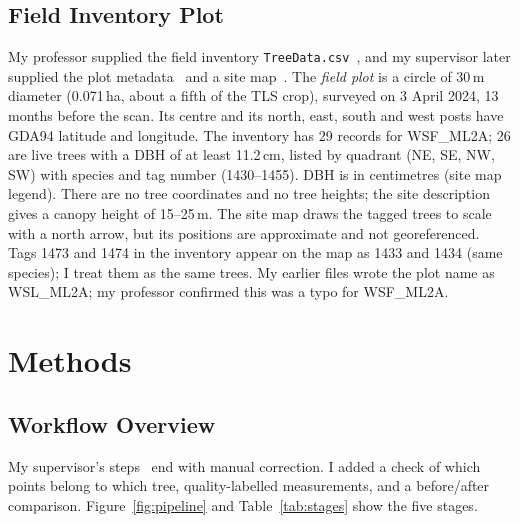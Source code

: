 \documentclass[runningheads]{llncs}
\begin{document}
\subsection{Field Inventory Plot}\label{sec:field}
My professor supplied the field inventory \texttt{TreeData.csv}~\cite{treedata}, and my supervisor later supplied the plot metadata~\cite{plotdata} and a site map~\cite{sitemap}. The \emph{field plot} is a circle of 30\,m diameter (0.071\,ha, about a fifth of the TLS crop), surveyed on 3 April 2024, 13 months before the scan. Its centre and its north, east, south and west posts have GDA94 latitude and longitude. The inventory has 29 records for WSF\_ML2A; 26 are live trees with a DBH of at least 11.2\,cm, listed by quadrant (NE, SE, NW, SW) with species and tag number (1430--1455). DBH is in centimetres (site map legend). There are no tree coordinates and no tree heights; the site description gives a canopy height of 15--25\,m. The site map draws the tagged trees to scale with a north arrow, but its positions are approximate and not georeferenced. Tags 1473 and 1474 in the inventory appear on the map as 1433 and 1434 (same species); I treat them as the same trees. My earlier files wrote the plot name as WSL\_ML2A; my professor confirmed this was a typo for WSF\_ML2A.

\section{Methods}\label{sec:method}

\subsection{Workflow Overview}
My supervisor's steps~\cite{pipeline} end with manual correction. I added a check of which points belong to which tree, quality-labelled measurements, and a before/after comparison. Figure~\ref{fig:pipeline} and Table~\ref{tab:stages} show the five stages.
\end{document}

